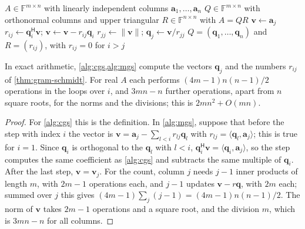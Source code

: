 \begin{algorithm}
\begin{algorithmic}[1]
\Require $A\in\mathbb F^{m\times n}$ with linearly independent columns $\mathbf a_1,\ldots,\mathbf a_n$
\Ensure $Q\in\mathbb F^{m\times n}$ with orthonormal columns and upper triangular $R\in\mathbb F^{n\times n}$ with $A=QR$
  \State $\mathbf v\gets\mathbf a_j$
    \State $r_{ij}\gets\mathbf q_i^{\mathsf H}\mathbf v$; $\mathbf v\gets\mathbf v-r_{ij}\mathbf q_i$ 
  \EndFor
  \State $r_{jj}\gets\|\mathbf v\|$; $\mathbf q_j\gets\mathbf v/r_{jj}$
\EndFor
\State \Return $Q=(\mathbf q_1,\ldots,\mathbf q_n)$ and $R=(r_{ij})$, with $r_{ij}=0$ for $i>j$
\end{algorithmic}
\caption{The modified Gram--Schmidt algorithm. In exact arithmetic it computes the same $Q$ and $R$ as \cref{alg:cgs}, with the same number of operations; in floating-point arithmetic it keeps the columns of $Q$ much closer to orthogonal.}
\label{alg:mgs}
\end{algorithm}

\begin{proposition}
\label{prop:cgs-mgs}
In exact arithmetic, \cref{alg:cgs,alg:mgs} compute the vectors $\mathbf q_j$ and the numbers $r_{ij}$ of \cref{thm:gram-schmidt}. For real $A$ each performs $(4m-1)n(n-1)/2$ operations in the loops over $i$, and $3mn-n$ further operations, apart from $n$ square roots, for the norms and the divisions; this is $2mn^2+O(mn)$.
\end{proposition}

\begin{proof}
For \cref{alg:cgs} this is the definition. In \cref{alg:mgs}, suppose that before the step with index $i$ the vector is $\mathbf v=\mathbf a_j-\sum_{l<i}r_{lj}\mathbf q_l$ with $r_{lj}=\langle\mathbf q_l,\mathbf a_j\rangle$; this is true for $i=1$. Since $\mathbf q_i$ is orthogonal to the $\mathbf q_l$ with $l<i$, $\mathbf q_i^{\mathsf H}\mathbf v=\langle\mathbf q_i,\mathbf a_j\rangle$, so the step computes the same coefficient as \cref{alg:cgs} and subtracts the same multiple of $\mathbf q_i$. After the last step, $\mathbf v=\mathbf v_j$. For the count, column $j$ needs $j-1$ inner products of length $m$, with $2m-1$ operations each, and $j-1$ updates $\mathbf v-r\mathbf q$, with $2m$ each; summed over $j$ this gives $(4m-1)\sum_j(j-1)=(4m-1)n(n-1)/2$. The norm of $\mathbf v$ takes $2m-1$ operations and a square root, and the division $m$, which is $3mn-n$ for all columns.
\end{proof}


